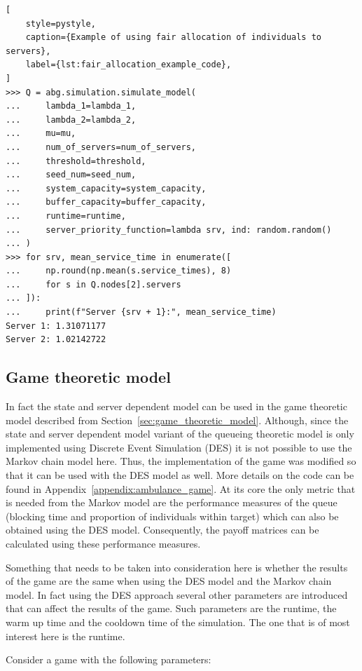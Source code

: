\begin{lstlisting}[
    style=pystyle,
    caption={Example of using fair allocation of individuals to servers},
    label={lst:fair_allocation_example_code},
]
>>> Q = abg.simulation.simulate_model(
...     lambda_1=lambda_1,
...     lambda_2=lambda_2,
...     mu=mu,
...     num_of_servers=num_of_servers,
...     threshold=threshold,
...     seed_num=seed_num,
...     system_capacity=system_capacity,
...     buffer_capacity=buffer_capacity,
...     runtime=runtime,
...     server_priority_function=lambda srv, ind: random.random()
... )
>>> for srv, mean_service_time in enumerate([
...     np.round(np.mean(s.service_times), 8)
...     for s in Q.nodes[2].servers
... ]):
...     print(f"Server {srv + 1}:", mean_service_time)
Server 1: 1.31071177
Server 2: 1.02142722

\end{lstlisting}


\subsection{Game theoretic model}

In fact the state and server dependent model can be used in the game theoretic
model described from Section~\ref{sec:game_theoretic_model}.
Although, since the state and server dependent model variant of the queueing
theoretic model is only implemented using Discrete Event Simulation (DES) it is
not possible to use the Markov chain model here.
Thus, the implementation of the game was modified so that it can be used with
the DES model as well.
More details on the code can be found in
Appendix~\ref{appendix:ambulance_game}.
At its core the only metric that is needed from the Markov model are the
performance measures of the queue (blocking time and proportion of individuals
within target) which can also be obtained using the DES model.
Consequently, the payoff matrices can be calculated using these performance
measures.

Something that needs to be taken into consideration here is whether the results
of the game are the same when using the DES model and the Markov chain model.
In fact using the DES approach several other parameters are introduced that
can affect the results of the game.
Such parameters are the runtime, the warm up time and the cooldown time of the
simulation.
The one that is of most interest here is the runtime.

Consider a game with the following parameters:

